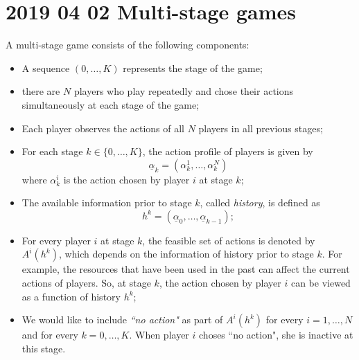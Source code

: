 \section{2019 04 02 Multi-stage games}
 
\begin{definition}
	A multi-stage game consists of the following components:
	\begin{itemize}
		\item A sequence $(0,\ldots,K)$ represents the stage of the game;
		\item there are $N$ players who play repeatedly and chose their actions simultaneously at each stage of the game;
		\item Each player observes the actions of all $N$ players in all previous stages;
		\item For each stage $k\in \{0,\ldots, K\}$, the action profile of players is given by
		$$
			\underline{\alpha}_{k} = (\alpha_k^{1}, \ldots, \alpha_{k}^N)
		$$
		where $\alpha_{k}^i$ is the action chosen by player $i$ at stage $k$;
		\item The available information prior to stage $k$, called \textit{history}, is defined as 
		$$
			h^k = (\underline{\alpha}_0, \ldots, \underline{\alpha}_{k-1});
		$$
		\item For every player $i$ at stage $k$, the feasible set of actions is denoted by
		$ A^{i}(h^k)$, which depends on the information of history prior to stage $k$. For example, the resources that have been used in the past can affect the current actions of players. So, at stage $k$, the action chosen by player $i$ can be viewed as a function of history $h^k$;
		
		\item We would like to include \textit{``no  action"} as part of  $A^i(h^k)$ for every $i=1,\ldots,N$ and for every $k=0, \ldots, K$. When player $i$ choses ``no action", she is inactive at this stage.
	\end{itemize}
\end{definition}

